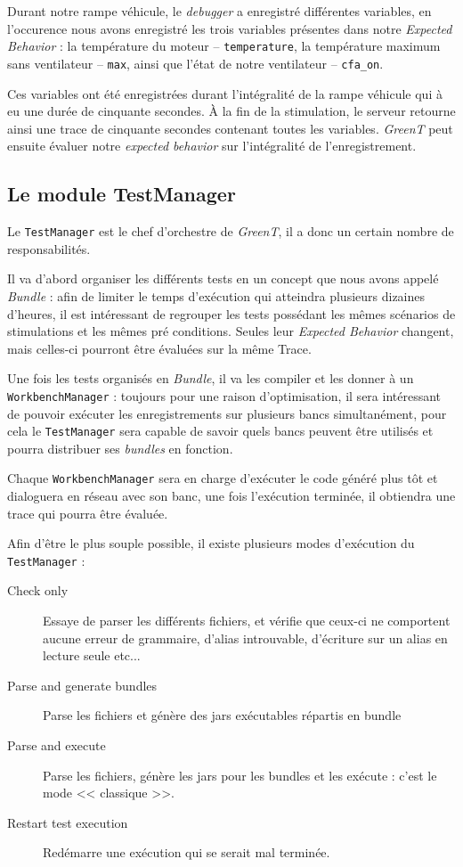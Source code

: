 \begin{exemple}
	Durant notre rampe véhicule, le \textit{debugger} a enregistré différentes variables, en l'occurence nous avons enregistré les trois variables présentes dans notre \textit{Expected Behavior} : la température	du moteur -- \texttt{temperature}, la température maximum sans ventilateur -- \texttt{max}, ainsi que l'état de notre ventilateur -- \texttt{cfa\_on}.
	
	Ces variables ont été enregistrées durant l'intégralité de la rampe véhicule qui à eu une durée de cinquante secondes. À la fin de la stimulation, le serveur retourne ainsi une trace de cinquante secondes contenant toutes les variables. \textit{GreenT} peut ensuite évaluer notre \textit{expected behavior} sur l'intégralité de l'enregistrement.
\end{exemple}
\subsection{Le module TestManager}\label{testManager}
Le \texttt{TestManager} est le chef d'orchestre de \textit{GreenT}, il a donc un certain nombre de responsabilités. 

Il va d'abord organiser les différents tests en un concept que nous avons appelé \textit{Bundle} : afin de limiter le temps d'exécution qui atteindra plusieurs dizaines d'heures, il est intéressant de regrouper les tests possédant les mêmes scénarios de stimulations et les mêmes pré conditions. Seules leur \textit{Expected Behavior} changent, mais celles-ci pourront être évaluées sur la même Trace.

Une fois les tests organisés en \textit{Bundle}, il va les compiler et les donner à un \texttt{WorkbenchManager} : toujours pour une
raison d'optimisation, il sera intéressant de pouvoir exécuter les enregistrements sur plusieurs bancs simultanément, pour cela le
\texttt{TestManager} sera capable de savoir quels bancs peuvent être utilisés et pourra distribuer ses \textit{bundles} en fonction. 

Chaque \texttt{WorkbenchManager} sera en charge d'exécuter le code généré plus tôt et dialoguera en réseau avec son banc, une fois l'exécution terminée, il obtiendra une trace qui pourra être évaluée.

Afin d'être le plus souple possible, il existe plusieurs modes d'exécution du \texttt{TestManager} : 
\begin{description}
	\item[Check only] Essaye de parser les différents fichiers, et vérifie que ceux-ci ne comportent aucune erreur de grammaire, d'alias introuvable, d'écriture sur un alias en lecture seule etc...
	\item[Parse and generate bundles] Parse les fichiers et génère des jars exécutables répartis en bundle
	\item[Parse and execute] Parse les fichiers, génère les jars pour les bundles et les exécute : c'est le mode << classique >>.
	\item[Restart test execution] Redémarre une exécution qui se serait mal terminée.
\end{description}


